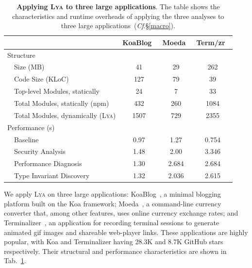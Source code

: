 \documentclass[letterpaper,twocolumn,10pt]{article}
\newcommand{\cf}[1]{(\emph{Cf}.\S\ref{#1})}
\newcommand{\sys}{{\scshape Lya}\xspace}
\begin{document}
\begin{table}[b]
\center
\footnotesize
\setlength\tabcolsep{3pt}
\caption{
  \footnotesize{
    \textbf{Applying \sys to three large applications}.
    The table shows the characteristics and runtime overheads of applying the three analyses to three large applications~\cf{macro}.
  }
}
\begin{tabular*}{\columnwidth}{l @{\extracolsep{\fill}} ccc}
\toprule
                                     & KoaBlog~\cite{koa}    & Moeda~\cite{moeda}   &  Term/zr~\cite{terminalizer} \\
\midrule
Structure                            &                   &                      &              \\
~~Size (MB)                          & 41                &  29                  &   262        \\
~~Code Size (KLoC)                   & 127               &  79                  &   39         \\
~~Top-level Modules, statically      &  24               &  7                   &    33         \\
~~Total Modules, statically (npm)    &  432              &  260                 &    1084       \\
~~Total Modules, dynamically (\sys)  &  1507             &   729                &     2355      \\
Performance (s)                      &                   &                      &              \\
~~Baseline                           &  0.97             &  1.27                &    0.754      \\
~~Security Analysis                  &  1.48             &  2.00                &    3.346      \\
~~Performance Diagnosis              &  1.30             &  2.684               &    2.684      \\
~~Type Invariant Discovery           &  1.32             &  2.036               &    2.615      \\     
\bottomrule
\end{tabular*}
\label{tab:macro}
\vspace{-5mm}
\end{table}


We apply \sys on three large applications:
  KoaBlog~\cite{koa}, a minimal blogging platform built on the Koa framework;
  Moeda~\cite{moeda}, a command-line currency converter that, among other features, uses online currency exchange rates; and
  Terminalizer~\cite{terminalizer}, an application for recording terminal sessions to generate animated gif images and shareable web-player links.
These applications are highly popular, with Koa and Terminalizer having 28.3K and 8.7K GitHub stars respectively.
Their structural and performance characteristics are shown in Tab.~\ref{tab:macro}.
\end{document}
